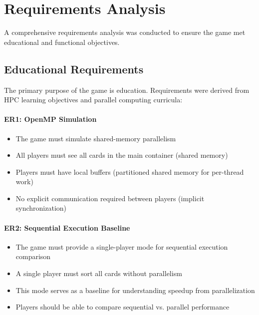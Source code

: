 
\section{Requirements Analysis}
\label{sec:requirements}

A comprehensive requirements analysis was conducted to ensure the game met educational and functional objectives.

\subsection{Educational Requirements}
\label{subsec:educational-requirements}

The primary purpose of the game is education. Requirements were derived from HPC learning objectives and parallel computing curricula:

\paragraph*{ER1: OpenMP Simulation}
\begin{itemize}
    \item The game must simulate shared-memory parallelism
    \item All players must see all cards in the main container (shared memory)
    \item Players must have local buffers (partitioned shared memory for per-thread work)
    \item No explicit communication required between players (implicit synchronization)
\end{itemize}

\paragraph*{ER2: Sequential Execution Baseline}
\begin{itemize}
    \item The game must provide a single-player mode for sequential execution comparison
    \item A single player must sort all cards without parallelism
    \item This mode serves as a baseline for understanding speedup from parallelization
    \item Players should be able to compare sequential vs. parallel performance
\end{itemize}

